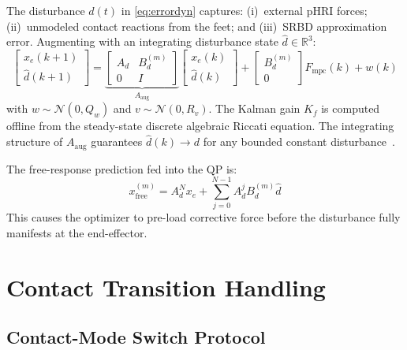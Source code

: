 \documentclass[journal]{IEEEtran}
\newcommand{\Fmpc}{F_{\text{mpc}}}
\newcommand{\dhat}{\hat{d}}
\begin{document}
The disturbance $d(t)$ in \eqref{eq:errordyn} captures: (i)~external pHRI
forces; (ii)~unmodeled contact reactions from the feet; and (iii)~SRBD
approximation error.
Augmenting with an integrating disturbance state $\dhat\in\mathbb{R}^3$:
\begin{equation}\label{eq:augstate}
  \begin{bmatrix}x_e(k{+}1)\\\dhat(k{+}1)\end{bmatrix}
  =\underbrace{\begin{bmatrix}A_d & B_d^{(m)} \\ 0 & I\end{bmatrix}}_{A_{\text{aug}}}
  \begin{bmatrix}x_e(k)\\\dhat(k)\end{bmatrix}
  +\begin{bmatrix}B_d^{(m)}\\0\end{bmatrix}\Fmpc(k)+w(k)
\end{equation}
with $w\sim\mathcal{N}(0,Q_w)$ and $v\sim\mathcal{N}(0,R_v)$.
The Kalman gain $K_f$ is computed offline from the steady-state discrete
algebraic Riccati equation.
The integrating structure of $A_{\text{aug}}$ guarantees $\dhat(k)\to d$
for any bounded constant disturbance~\cite{cao2004antiwindup}.

The free-response prediction fed into the QP is:
\begin{equation}\label{eq:freeresponse}
  x_{\text{free}}^{(m)} = A_d^N x_e + \sum_{j=0}^{N-1}A_d^j B_d^{(m)}\dhat
\end{equation}
This causes the optimizer to pre-load corrective force before the
disturbance fully manifests at the end-effector.

\section{Contact Transition Handling}\label{sec:switching}

\subsection{Contact-Mode Switch Protocol}
\end{document}
